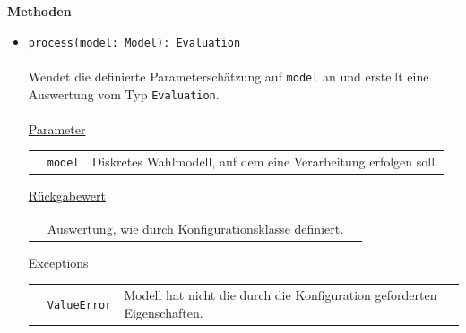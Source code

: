 \documentclass{article}
\begin{document}
\begin{itemize}
\textbf{Methoden}
\begin{itemize}\setlength\itemsep{3em}
\item \texttt{process(model: Model): Evaluation}\\\\
Wendet die definierte Parameterschätzung auf \texttt{model} an und erstellt eine Auswertung vom Typ \texttt{Evaluation}.
\\\\
\underline{Parameter}\\
\begin{tabular}{lll}
 & \texttt{model} & Diskretes Wahlmodell, auf dem eine Verarbeitung erfolgen soll.\\
\end{tabular}

\underline{Rückgabewert}\\
\begin{tabular}{lll}
 & Auswertung, wie durch Konfigurationsklasse definiert.\\
\end{tabular}

\underline{Exceptions}\\
\begin{tabular}{lll}
 & \texttt{ValueError} & Modell hat nicht die durch die Konfiguration geforderten Eigenschaften.\\
\end{tabular}
\end{itemize}

\newpage

\end{itemize}
\end{document}
